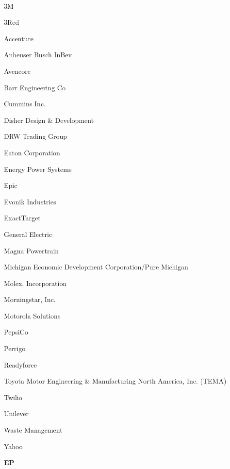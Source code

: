 \documentclass[twoside]{article}
\begin{document}
\begin{center}
\begin{multicols}{5}
        \vspace{-1em}
        ~\hrulefill~
        \vspace{-.9em}
        \begin{FlushLeft}
        \begin{compactitem}
        \item 3M
\item 3Red
\item Accenture
\item Anheuser Busch InBev
\item Avencore
\item Barr Engineering Co
\item Cummins Inc.
\item Disher Design \& Development
\item DRW Trading Group
\item Eaton Corporation
\item Energy Power Systems
\item Epic
\item Evonik Industries
\item ExactTarget
\item General Electric
\item Magna Powertrain
\item Michigan Economic Development Corporation/Pure Michigan
\item Molex, Incorporation
\item Morningstar, Inc.
\item Motorola Solutions
\item PepsiCo
\item Perrigo
\item Readyforce
\item Toyota Motor Engineering \& Manufacturing North America, Inc. (TEMA)
\item Twilio
\item Unilever
\item Waste Management
\item Yahoo
\end{compactitem}
        \end{FlushLeft}
        \vspace{1em}
        {\fontsize{14}{16}\selectfont \bf EP}\\
        \vspace{-1em}
        ~\hrulefill~
        \vspace{-.9em}
        \begin{FlushLeft}
        \begin{compactitem}

\end{compactitem}
\end{FlushLeft}
\end{multicols}
\end{center}
\end{document}

